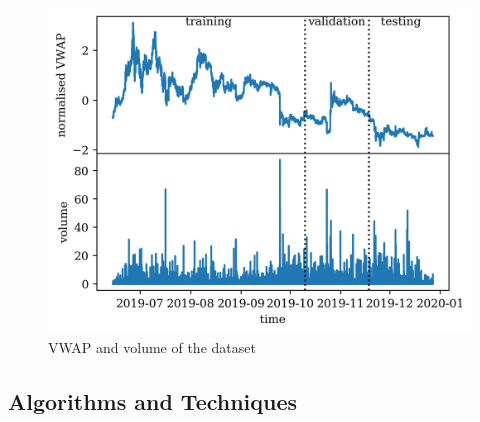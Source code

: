 \documentclass[12pt, letterpaper]{article}
\begin{document}
\begin{figure}
    \centering
    \includegraphics[width=\textwidth]{figures/dataset.png}
    \caption{VWAP and volume of the dataset}%
    \label{fig:dataset}
\end{figure}

\subsection{Algorithms and Techniques}


\end{document}

